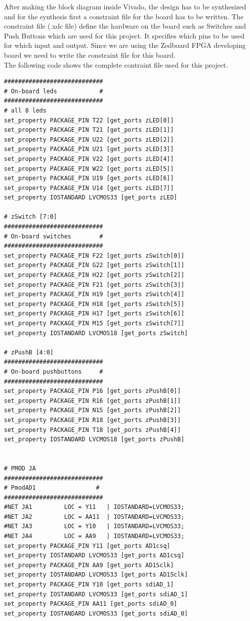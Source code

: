 After making the block diagram inside Vivado, the design has to be synthesized and for the synthesis first a constraint file for the board has to be written. The constraint file (.xdc file) define the hardware on the board such as Switches and Push Buttons which are used for this project. It specifies which pins to be used for which input and output. Since we are using the Zedboard FPGA developing board we need to write the constraint file for this board. \\
The following code shows the complete contraint file used for this project. 
\begin{verbatim}
############################
# On-board leds            #
############################
# all 8 leds
set_property PACKAGE_PIN T22 [get_ports zLED[0]]
set_property PACKAGE_PIN T21 [get_ports zLED[1]]
set_property PACKAGE_PIN U22 [get_ports zLED[2]]
set_property PACKAGE_PIN U21 [get_ports zLED[3]]
set_property PACKAGE_PIN V22 [get_ports zLED[4]]
set_property PACKAGE_PIN W22 [get_ports zLED[5]]
set_property PACKAGE_PIN U19 [get_ports zLED[6]]
set_property PACKAGE_PIN U14 [get_ports zLED[7]]
set_property IOSTANDARD LVCMOS33 [get_ports zLED]

# zSwitch [7:0]
############################
# On-board switches        #
############################
set_property PACKAGE_PIN F22 [get_ports zSwitch[0]]
set_property PACKAGE_PIN G22 [get_ports zSwitch[1]]
set_property PACKAGE_PIN H22 [get_ports zSwitch[2]]
set_property PACKAGE_PIN F21 [get_ports zSwitch[3]]
set_property PACKAGE_PIN H19 [get_ports zSwitch[4]]
set_property PACKAGE_PIN H18 [get_ports zSwitch[5]]
set_property PACKAGE_PIN H17 [get_ports zSwitch[6]]
set_property PACKAGE_PIN M15 [get_ports zSwitch[7]]
set_property IOSTANDARD LVCMOS18 [get_ports zSwitch]

# zPushB [4:0]
############################
# On-board pushbuttons     #
############################
set_property PACKAGE_PIN P16 [get_ports zPushB[0]]
set_property PACKAGE_PIN R16 [get_ports zPushB[1]]
set_property PACKAGE_PIN N15 [get_ports zPushB[2]]
set_property PACKAGE_PIN R18 [get_ports zPushB[3]]
set_property PACKAGE_PIN T18 [get_ports zPushB[4]]
set_property IOSTANDARD LVCMOS18 [get_ports zPushB]


# PMOD JA
############################
# PmodAD1                 #
############################
#NET JA1         LOC = Y11   | IOSTANDARD=LVCMOS33;
#NET JA2         LOC = AA11  | IOSTANDARD=LVCMOS33;
#NET JA3         LOC = Y10   | IOSTANDARD=LVCMOS33;
#NET JA4         LOC = AA9   | IOSTANDARD=LVCMOS33;
set_property PACKAGE_PIN Y11 [get_ports AD1csq]
set_property IOSTANDARD LVCMOS33 [get_ports AD1csq]
set_property PACKAGE_PIN AA9 [get_ports AD1Sclk]
set_property IOSTANDARD LVCMOS33 [get_ports AD1Sclk]
set_property PACKAGE_PIN Y10 [get_ports sdiAD_1]
set_property IOSTANDARD LVCMOS33 [get_ports sdiAD_1]
set_property PACKAGE_PIN AA11 [get_ports sdiAD_0]
set_property IOSTANDARD LVCMOS33 [get_ports sdiAD_0]



\end{verbatim}
